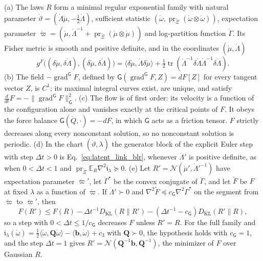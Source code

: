 \begin{proposition}\label{prop:llp_flow}
(a) The laws $R$ form a minimal regular exponential family with natural parameter $\mathring\vartheta=(\mathring\Lambda\mathring\mu,-\frac12\mathring\Lambda)$, sufficient statistic $(\mathring\omega,\operatorname{pr}_{\mathring\Xi}(\mathring\omega\otimes\mathring\omega))$, expectation parameter $\mathring\varpi=(\mathring\mu,\mathring\Lambda^{-1}+\operatorname{pr}_{\mathring\Xi}(\mathring\mu\otimes\mathring\mu))$ and log-partition function $\mathring\Gamma$. Its Fisher metric is smooth and positive definite, and in the coordinates $(\mathring\mu,\mathring\Lambda)$
\begin{equation}
g^F\bigl((\delta\mathring\mu,\delta\mathring\Lambda),(\delta\mathring\mu,\delta\mathring\Lambda)\bigr)=\langle\delta\mathring\mu,\mathring\Lambda\delta\mathring\mu\rangle+\tfrac12\operatorname{tr}(\mathring\Lambda^{-1}\delta\mathring\Lambda\mathring\Lambda^{-1}\delta\mathring\Lambda).
\label{eq:llp_gaussian_fisher}
\end{equation}
(b) The field $-\operatorname{grad}^{\mathsf G}F$, defined by $\mathsf G(\operatorname{grad}^{\mathsf G}F,Z)=dF[Z]$ for every tangent vector $Z$, is $C^1$; its maximal integral curves exist, are unique, and satisfy $\frac{d}{dt}F=-\|\operatorname{grad}^{\mathsf G}F\|_{\mathsf G}^2$.
(c) The flow is of first order: its velocity is a function of the configuration alone and vanishes exactly at the critical points of $F$. It obeys the force balance $\mathsf G(\dot Q,\cdot)=-dF$, in which $\mathsf G$ acts as a friction tensor. $F$ strictly decreases along every nonconstant solution, so no nonconstant solution is periodic.
(d) In the chart $(\mathring\vartheta,\lambda)$ the generator block of the explicit Euler step with step $\Delta t>0$ is Eq.~\eqref{eq:latent_link_blr}, whenever $\mathring\Lambda'$ is positive definite, as when $0<\Delta t<1$ and $\operatorname{pr}_{\mathring\Xi}\mathbb E_R\nabla^2\mathfrak i_\lambda\succeq0$.
(e) Let $R'=\mathcal N(\mathring\mu',\mathring\Lambda'^{-1})$ have expectation parameter $\mathring\varpi'$, let $\mathring\Gamma^\star$ be the convex conjugate of $\mathring\Gamma$, and let $\widetilde F$ be $F$ at fixed $\lambda$ as a function of $\mathring\varpi$. If $\mathring\Lambda'\succ0$ and $\nabla^2\widetilde F\preceq c_{\mathsf G}\nabla^2\mathring\Gamma^\star$ on the segment from $\mathring\varpi$ to $\mathring\varpi'$, then
\begin{equation}
F(R')\leq F(R)-\Delta t^{-1}D_{\mathrm{KL}}(R\|R')-(\Delta t^{-1}-c_{\mathsf G})D_{\mathrm{KL}}(R'\|R),
\label{eq:llp_blr_descent}
\end{equation}
so a step with $0<\Delta t\leq1/c_{\mathsf G}$ decreases $F$ unless $R'=R$. For the full family and $\mathfrak i_\lambda(\mathring\omega)=\frac12\langle\mathring\omega,\mathbf Q\mathring\omega\rangle-\langle\mathbf b,\mathring\omega\rangle+c_3$ with $\mathbf Q\succ0$, the hypothesis holds with $c_{\mathsf G}=1$, and the step $\Delta t=1$ gives $R'=\mathcal N(\mathbf Q^{-1}\mathbf b,\mathbf Q^{-1})$, the minimizer of $F$ over Gaussian $R$.
\end{proposition}

